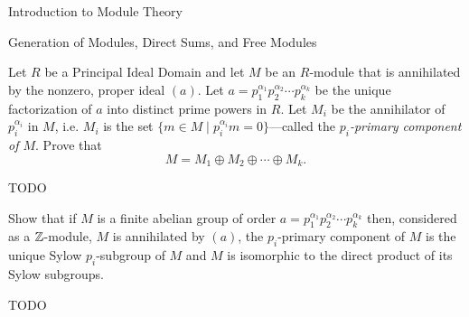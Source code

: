 \begin{chapter}{Introduction to Module Theory}
\begin{section}{Generation of Modules, Direct Sums, and Free Modules}
\begin{solution}
\end{solution}\oneperpage



\begin{problem}\label{ex:10.3.18}
Let $R$ be a Principal Ideal Domain and let $M$ be an $R$-module that is annihilated by the nonzero, proper ideal $(a)$. Let $a = p_1^{\alpha_1}p_2^{\alpha_2}\cdots p_k^{\alpha_k}$ be the unique factorization of $a$ into distinct prime powers in $R$. Let $M_i$ be the annihilator of $p_i^{\alpha_i}$ in $M$, i.e. $M_i$ is the set $\{m\in M\mid p_i^{\alpha_i}m = 0\}$---called the \emph{$p_i$-primary component of $M$}. Prove that \[
M = M_1\oplus M_2\oplus \cdots \oplus M_k.
\]
\end{problem}
\begin{solution}TODO

\end{solution}\oneperpage



\begin{problem}\label{ex:10.3.19}
Show that if $M$ is a finite abelian group of order $a=p_1^{\alpha_1}p_2^{\alpha_2}\cdots p_k^{\alpha_k}$ then, considered as a $\mathbb{Z}$-module, $M$ is annihilated by $(a)$, the $p_i$-primary component of $M$ is the unique Sylow $p_i$-subgroup of $M$ and $M$ is isomorphic to the direct product of its Sylow subgroups.
\end{problem}
\begin{solution}TODO

\end{solution}\oneperpage




\end{section}
\end{chapter}
